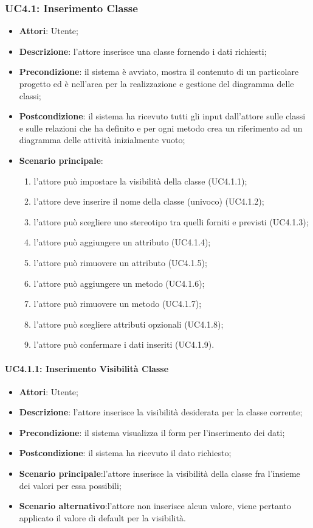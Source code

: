 \subsubsection{UC4.1: Inserimento Classe}
\label{UC4.1}
\begin{itemize}
\item \textbf{Attori}: Utente;
\item \textbf{Descrizione}: l'attore inserisce una classe fornendo i dati richiesti;
\item \textbf{Precondizione}: il sistema è avviato, mostra il contenuto di un particolare progetto ed è nell'area per la realizzazione e gestione del diagramma delle classi;
\item \textbf{Postcondizione}: il sistema ha ricevuto tutti gli input dall'attore sulle classi e sulle relazioni che ha definito e per ogni metodo crea un riferimento ad un diagramma delle attività inizialmente vuoto;
\item \textbf{Scenario principale}:
	\begin{enumerate}
		\item l'attore può impostare la visibilità della classe (UC4.1.1);
		\item l'attore deve inserire il nome della classe (univoco) (UC4.1.2);
		\item l'attore può scegliere uno stereotipo tra quelli forniti e previsti (UC4.1.3);
		\item l'attore può aggiungere un attributo (UC4.1.4);
		\item l'attore può rimuovere un attributo (UC4.1.5);
		\item l'attore può aggiungere un metodo (UC4.1.6);
		\item l'attore può rimuovere un metodo (UC4.1.7);
		\item l'attore può scegliere attributi opzionali (UC4.1.8);
		\item l'attore può confermare i dati inseriti (UC4.1.9).
	\end{enumerate}
\end{itemize}

\paragraph{UC4.1.1: Inserimento Visibilità Classe}
\label{UC4.1.1}
\begin{itemize}
\item \textbf{Attori}: Utente;
\item \textbf{Descrizione}: l'attore inserisce la visibilità desiderata per la classe corrente;
\item \textbf{Precondizione}: il sistema visualizza il form per l'inserimento dei dati;
\item \textbf{Postcondizione}: il sistema ha ricevuto il dato richiesto;
\item \textbf{Scenario principale}:l'attore inserisce la visibilità della classe fra l'insieme dei valori per essa possibili;
\item \textbf{Scenario alternativo}:l'attore non inserisce alcun valore, viene pertanto applicato il valore di default per la visibilità.
\end{itemize}

